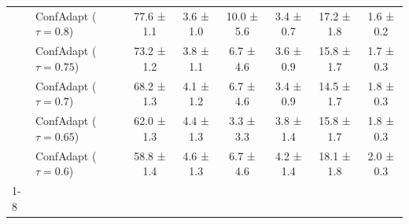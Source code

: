 \documentclass{article}
\theoremstyle{plain}
\theoremstyle{definition}
\theoremstyle{remark}
\begin{document}
\begin{table}[h!]
\begin{tabular}{llcccccc}
 & ConfAdapt ($\tau=0.8$) & 77.6 ± 1.1 & 3.6 ± 1.0 & 10.0 ± 5.6 & 3.4 ± 0.7 & 17.2 ± 1.8 & 1.6 ± 0.2 \\
 & ConfAdapt ($\tau=0.75$) & 73.2 ± 1.2 & 3.8 ± 1.1 & 6.7 ± 4.6 & 3.6 ± 0.9 & 15.8 ± 1.7 & 1.7 ± 0.3 \\
 & ConfAdapt ($\tau=0.7$) & 68.2 ± 1.3 & 4.1 ± 1.2 & 6.7 ± 4.6 & 3.4 ± 0.9 & 14.5 ± 1.7 & 1.8 ± 0.3 \\
 & ConfAdapt ($\tau=0.65$) & 62.0 ± 1.3 & 4.4 ± 1.3 & 3.3 ± 3.3 & 3.8 ± 1.4 & 15.8 ± 1.7 & 1.8 ± 0.3 \\
 & ConfAdapt ($\tau=0.6$) & 58.8 ± 1.4 & 4.6 ± 1.3 & 6.7 ± 4.6 & 4.2 ± 1.4 & 18.1 ± 1.8 & 2.0 ± 0.3 \\
\cline{1-8}
\bottomrule
\end{tabular}
\end{table}
\end{document}
